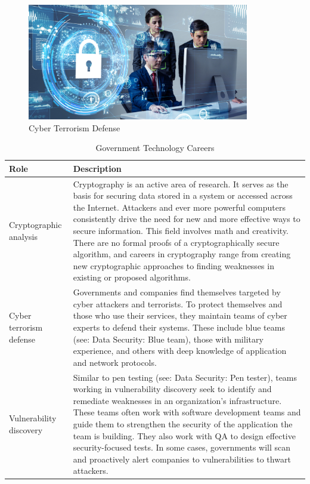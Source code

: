 \begin{figure}[H]
	\begin{center}
		\caption{Cyber Terrorism Defense}
		\vskip 4pt
		\includegraphics[height=2in]{images/careers/iStock-1169668290.small.jpg}
	\end{center}
\end{figure}

\begin{table}[H]
	\begin{center}
		\caption{Government Technology Careers}
		\vskip 4pt
		\begin{tabular}{p{1in}|p{3.4in}} 
			\textbf{Role} & \textbf{Description}\\
			\hline
			Cryptographic analysis & Cryptography is an active area of research. It serves as the basis for securing data stored in a system or accessed across the Internet. Attackers and ever more powerful computers consistently drive the need for new and more effective ways to secure information. This field involves math and creativity. There are no formal proofs of a cryptographically secure algorithm, and careers in cryptography range from creating new cryptographic approaches to finding weaknesses in existing or proposed algorithms.\\
			\hline
			Cyber terrorism defense & Governments and companies find themselves targeted by cyber attackers and terrorists. To protect themselves and those who use their services, they maintain teams of cyber experts to defend their systems. These include blue teams (see: Data Security: Blue team), those with military experience, and others with deep knowledge of application and network protocols.\\
			\hline
			Vulnerability discovery & Similar to pen testing (see: Data Security: Pen tester), teams working in vulnerability discovery seek to identify and remediate weaknesses in an organization's infrastructure. These teams often work with software development teams and guide them to strengthen the security of the application the team is building. They also work with QA to design effective security-focused tests. In some cases, governments will scan and proactively alert companies to vulnerabilities to thwart attackers.\\
			\hline
		\end{tabular}
	\end{center}
\end{table}

